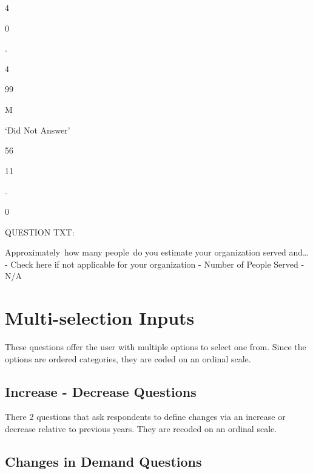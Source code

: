 \documentclass[
  letterpaper,
]{scrbook}
\begin{document}
4

0

.

4

99

M

`Did Not Answer'

56

11

.

0

QUESTION TXT:

Approximately~how many people~do you estimate your organization served
and\ldots{} - Check here if not applicable for your organization -
Number of People Served - N/A

\chapter{Multi-selection Inputs}\label{multi-selection-inputs-1}

These questions offer the user with multiple options to select one from.
Since the options are ordered categories, they are coded on an ordinal
scale.

\section{Increase - Decrease
Questions}\label{increase---decrease-questions-1}

There 2 questions that ask respondents to define changes via an increase
or decrease relative to previous years. They are recoded on an ordinal
scale.

\section{Changes in Demand
Questions}\label{changes-in-demand-questions-1}
\end{document}
